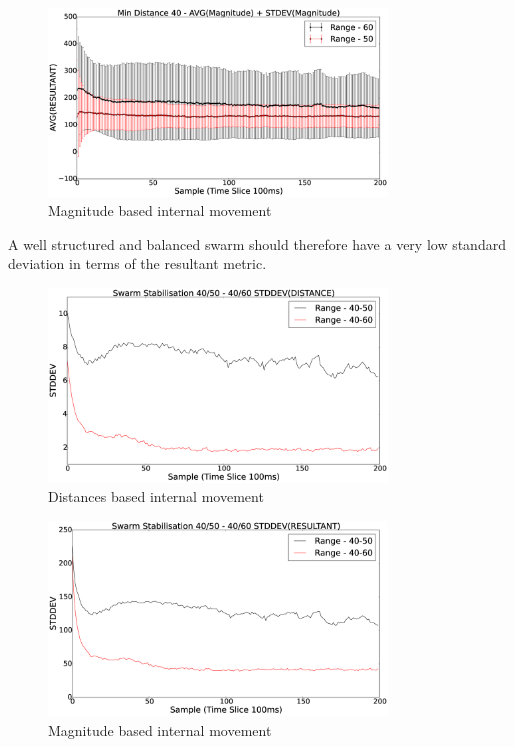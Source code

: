 \documentclass[10pt,journal,letterpaper,twoside]{IEEEtran}
\newcommand{\stability}{internal movement}
\begin{document}
\begin{figure}[H]
\begin{center}
\includegraphics[width=9cm]{figures/StabilityMagnitudeSwarm40-5060}
\end{center}
\caption{Magnitude based \stability{}\label{methods:StabilityMagnitudeSwarm40-5060}}
\end{figure}

A well structured and balanced swarm should therefore have a very low standard deviation in terms of the resultant metric.

\begin{figure}[H]
\begin{center}
\includegraphics[width=9cm]{figures/StabilityDistanceSwarm}
\end{center}
\caption{Distances based \stability{}\label{methods:StabilityDistanceSwarm}}
\end{figure}

\begin{figure}[H]
\begin{center}
\includegraphics[width=9cm]{figures/StabilityMagnitudeSwarm}
\end{center}
\caption{Magnitude based \stability{}\label{methods:StabilityMagnitudeSwarm}}
\end{figure}
\end{document}
